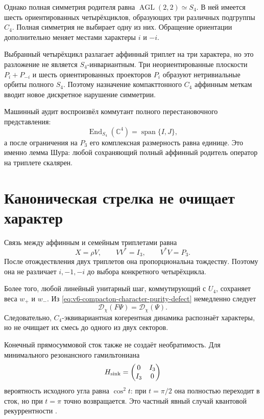 Однако полная симметрия родителя равна
$\operatorname{AGL}(2,2)\simeq S_4$. В ней имеется шесть ориентированных
четырёхциклов, образующих три различных подгруппы $C_4$. Полная симметрия
не выбирает одну из них. Обращение ориентации дополнительно меняет местами
характеры $i$ и $-i$.

\begin{proposition}
Выбранный четырёхцикл разлагает аффинный триплет на три характера, но это
разложение не является $S_4$-инвариантным. Три неориентированные плоскости
$P_i+P_{-i}$ и шесть ориентированных проекторов $P_i$ образуют нетривиальные
орбиты полного $S_4$. Поэтому назначение компакттонного $C_4$ аффинным
меткам вводит новое дискретное нарушение симметрии.
\end{proposition}

Машинный аудит воспроизвёл коммутант полного перестановочного
представления:
\begin{equation}
 \operatorname{End}_{S_4}(\mathbb C^4)=\operatorname{span}\{I,J\},
\end{equation}
а после ограничения на $P_3$ его комплексная размерность равна единице.
Это именно лемма Шура: любой сохраняющий полный аффинный родитель оператор
на триплете скалярен.

\section{Каноническая стрелка не очищает характер}

Связь между аффинным и семейным триплетами равна
\begin{equation}
 X=\rho V,
 \qquad
 VV^*=I_3,
 \qquad
 V^*V=P_3.
\end{equation}
После отождествления двух триплетов она пропорциональна тождеству. Поэтому
она не различает $i,-1,-i$ до выбора конкретного четырёхцикла.

Более того, любой линейный унитарный шаг, коммутирующий с $U_4$, сохраняет
веса $w_+$ и $w_-$. Из
\eqref{eq:v6-compacton-character-purity-defect} немедленно следует
\begin{equation}
 \mathcal D_\chi(F\Psi)=\mathcal D_\chi(\Psi).
\end{equation}
Следовательно, $C_4$-эквивариантная когерентная динамика распознаёт
характеры, но не очищает их смесь до одного из двух секторов.

Конечный прямосуммовой сток также не создаёт необратимость. Для
минимального резонансного гамильтониана
\begin{equation}
 H_{\rm sink}=
 \begin{pmatrix}
 0&I_3\\ I_3&0
 \end{pmatrix}
\end{equation}
вероятность исходного угла равна $\cos^2t$: при $t=\pi/2$ она полностью
переходит в сток, но при $t=\pi$ точно возвращается. Это частный явный
случай квантовой рекуррентности \cite{compacton-c4-bocchieri1957}.

